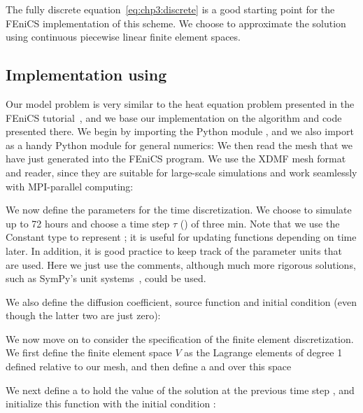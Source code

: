 The fully discrete equation~\eqref{eq:chp3:discrete} is a good
starting point for the FEniCS implementation of this scheme. We choose
to approximate the solution using continuous piecewise linear finite
element spaces. 

\subsection{Implementation using {\fenics}}
\label{sec:chp3:fenics-code-implementation}

Our model problem is very similar to the heat equation problem
presented in the FEniCS tutorial~\cite[Chapter
  3.1]{langtangen2016solving}, and we base our implementation on the
algorithm and code presented there. We begin by importing the Python
module , and we also import 
as a handy Python module for general numerics:
%
%
\noindent We then read the mesh that we have just generated into the FEniCS
program. We use the XDMF mesh format and reader, since they are suitable for
large-scale simulations and work seamlessly with MPI-parallel computing:

\noindent We now define the parameters for the time discretization. We
choose to simulate up to 72 hours and choose a time step $\tau$
() of three min. Note that we use the Constant type
to represent ; it is useful for updating functions
depending on time later. In addition, it is good practice to keep
track of the parameter units that are used. Here we just use the
comments, although much more rigorous solutions, such as SymPy's unit
systems~\cite{meurer2017sympy}, could be used.

\noindent We also define the diffusion coefficient, source function
and initial condition (even though the latter two are just zero):

We now move on to consider the specification of the finite element
discretization. We first define the finite element space $V$ as the
Lagrange elements of degree 1 defined relative to our mesh, and then
define a  and 
over this space 

\noindent We next define a  to hold the value
of the solution at the previous time step , and
initialize this function with the initial condition :

